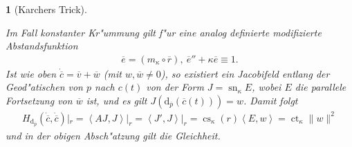 \documentclass[paper=A4, twoside, chapterprefix=true, bibliography=totoc, headsepline]{scrbook}
\DeclareMathOperator{\calJ}{\mathcal{J}}
\DeclareMathOperator{\cs}{cs}       %
\DeclareMathOperator{\ct}{ct}       %
\DeclareMathOperator{\sn}{sn}       %
\newcommand{\dop}{\mathrm{d}}
\theoremstyle{plain}
\theoremstyle{nonumberplain}
\theoremstyle{empty}
\newtheorem{emptythm}{}%
\theoremstyle{break}
\begin{document}
\begin{emptythm}[Karchers Trick]
\begin{center}
\end{center}
  Im Fall konstanter Kr"ummung gilt f"ur eine analog definierte modifizierte Abstandsfunktion
  \begin{align*}
    \overline e = (m_{\kappa} \circ \overline r), \
    \overline e '' + \kappa \overline e \equiv 1.
  \end{align*}
  Ist wie oben $\dot{\overline c} = \overline v + \overline w$ (mit $w,\overline w \neq 0$), so existiert ein Jacobifeld entlang der Geod"atischen von $p$ nach $c(t)$ von der Form $J = \sn_{\kappa} E$, wobei $E$ die parallele Fortsetzung von $\overline w$ ist, und es gilt $J(\dop_{\overline p}(\overline c(t))) = w$.
  Damit folgt
  \begin{align*}
    H_{\dop_{\overline p}}(\dot{\overline c}, \dot{\overline c})|_r = \left<AJ,J\right>|_r
    = \left<J',J\right>|_r
    = \cs_{\kappa}(r)\left<E,w\right>
    = \ct_{\kappa}\|w\|^2
  \end{align*}
  und in der obigen Absch"atzung gilt die Gleichheit.
\end{emptythm}
\end{document}
